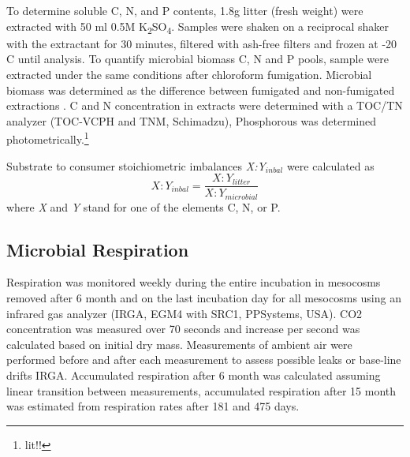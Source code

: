 \documentclass[authoryear,preprint,review,12pt]{elsarticle}
\begin{document}
To determine soluble C, N, and P contents, 1.8g litter (fresh weight) were extracted with 50 ml 0.5M K\textsubscript{2}SO\textsubscript{4}. Samples were shaken on a reciprocal shaker with the extractant for 30 minutes, filtered with ash-free filters and frozen at -20 \textdegree C until analysis. To quantify microbial biomass C, N and P pools, sample were extracted under the same conditions after chloroform fumigation. Microbial biomass was determined as the difference between fumigated and non-fumigated extractions \citep{Schinner1996}. C and N concentration in extracts were determined with a TOC/TN analyzer (TOC-VCPH and TNM, Schimadzu), Phosphorous was determined photometrically.\footnote{lit!!}

Substrate to consumer stoichiometric imbalances \emph{X:Y$_{inbal}$} were calculated as
\begin{equation}
 X:Y_{inbal}=\frac{X:Y_{litter}}{X:Y_{microbial}} \label{eq:resp.acc}
\end{equation}
where \emph{X} and \emph{Y} stand for one of the elements C, N, or P.

\subsection{Microbial Respiration}
Respiration was monitored weekly during the entire incubation in mesocosms removed after 6 month and on the last incubation day for all mesocosms using an infrared gas analyzer (IRGA, EGM4 with SRC1, PPSystems, USA). CO2 concentration was measured over 70 seconds and increase per second was calculated based on initial dry mass. Measurements of ambient air were performed before and after each measurement to assess possible leaks or base-line drifts IRGA. %
Accumulated respiration after 6 month was calculated assuming linear transition between measurements, accumulated respiration after 15 month was estimated from respiration rates after 181 and 475 days.

\end{document}
